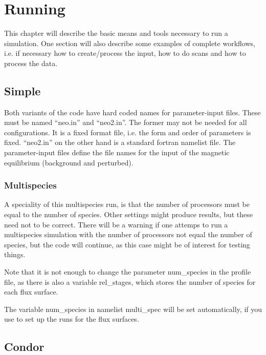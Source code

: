 \chapter{Running}
This chapter will describe the basic means and tools necessary to run a
\neotwo simulation.
One section will also describe some examples of complete workflows, i.e.
if necessary how to create/process the input, how to do scans and how to
process the data.

\section{Simple}
Both variants of the code have hard coded names for parameter-input
files. These must be named ``neo.in'' and ``neo2.in''. The former may
not be needed for all configurations. It is a fixed format file, i.e.
the form and order of parameters is fixed. ``neo2.in'' on the other hand
is a standard fortran namelist file.
The parameter-input files define the file names for the input of the
magnetic equilibrium (background and perturbed).

\subsection{Multispecies}
A speciality of this multispecies run, is that the number of processors
must be equal to the number of species. Other settings might produce
results, but these need not to be correct.
There will be a warning if one attemps to run a multispecies simulation
with the number of processors not equal the number of species, but the
code will continue, as this case might be of interest for testing
things.

Note that it is not enough to change the parameter num\_species in the
profile file, as there is also a variable rel\_stages, which stores the
number of species for each flux surface.

The variable num\_species in namelist multi\_spec will be set
automatically, if you use \neotwo to set up the runs for the flux
surfaces.

\section{Condor}


